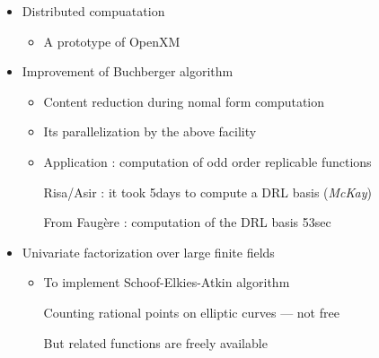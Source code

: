 \begin{slide}{}

\begin{itemize}
\item Distributed compuatation

\begin{itemize}
\item A prototype of OpenXM
\end{itemize}

\item Improvement of Buchberger algorithm

\begin{itemize}
\item Content reduction during nomal form computation

\item Its parallelization by the above facility

\item Application : computation of odd order replicable functions

Risa/Asir : it took 5days to compute a DRL basis ({\it McKay})

From Faug\`ere : computation of the DRL basis 53sec
\end{itemize}


\item Univariate factorization over large finite fields

\begin{itemize}
\item To implement Schoof-Elkies-Atkin algorithm 

Counting rational points on elliptic curves --- not free

But related functions are freely available
\end{itemize}
\end{itemize}

\end{slide}

